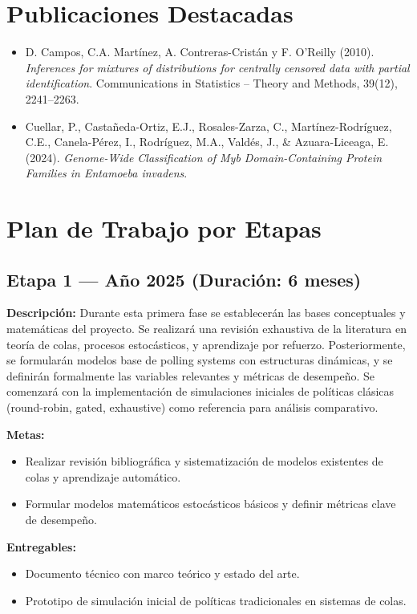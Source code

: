 \documentclass[12pt]{article}
\begin{document}
\section{Publicaciones Destacadas}
\begin{itemize}
  \item D. Campos, C.A. Martínez, A. Contreras-Cristán y F. O'Reilly (2010). \textit{Inferences for mixtures of distributions for centrally censored data with partial identification}. Communications in Statistics -- Theory and Methods, 39(12), 2241--2263.
  \item Cuellar, P., Castañeda-Ortiz, E.J., Rosales-Zarza, C., Martínez-Rodríguez, C.E., Canela-Pérez, I., Rodríguez, M.A., Valdés, J., \& Azuara-Liceaga, E. (2024). \textit{Genome-Wide Classification of Myb Domain-Containing Protein Families in Entamoeba invadens}.
\end{itemize}


\section{Plan de Trabajo por Etapas}

\subsection*{Etapa 1 — Año 2025 (Duración: 6 meses)}
\textbf{Descripción:} Durante esta primera fase se establecerán las bases conceptuales y matemáticas del proyecto. Se realizará una revisión exhaustiva de la literatura en teoría de colas, procesos estocásticos, y aprendizaje por refuerzo. Posteriormente, se formularán modelos base de polling systems con estructuras dinámicas, y se definirán formalmente las variables relevantes y métricas de desempeño. Se comenzará con la implementación de simulaciones iniciales de políticas clásicas (round-robin, gated, exhaustive) como referencia para análisis comparativo.

\textbf{Metas:}
\begin{itemize}
  \item Realizar revisión bibliográfica y sistematización de modelos existentes de colas y aprendizaje automático.
  \item Formular modelos matemáticos estocásticos básicos y definir métricas clave de desempeño.
\end{itemize}

\textbf{Entregables:}
\begin{itemize}
  \item Documento técnico con marco teórico y estado del arte.
  \item Prototipo de simulación inicial de políticas tradicionales en sistemas de colas.
\end{itemize}
\end{document}
